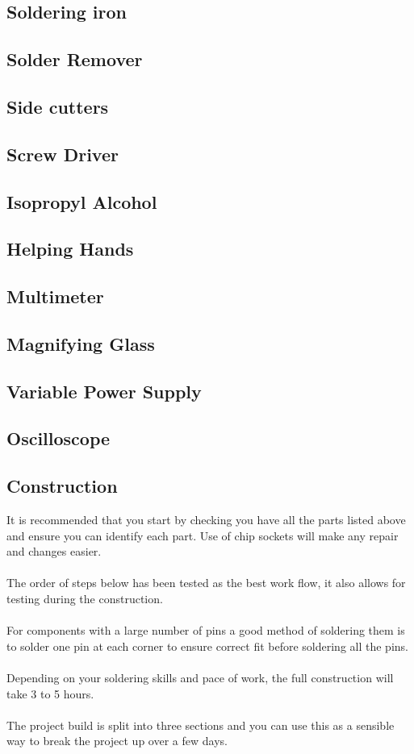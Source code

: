 \documentclass{ol-softwaremanual}
\begin{document}
\begin{ffcode}
\subsection{Soldering iron}
\subsection{Solder Remover}
\subsection{Side cutters}
\subsection{Screw Driver}
\subsection{Isopropyl Alcohol}
\subsection{Helping Hands}
\subsection{Multimeter}
\subsection{Magnifying Glass}
\subsection{Variable Power Supply}
\subsection{Oscilloscope}

\pagebreak

\subsection{Construction}
It is recommended that you start by checking you have all the parts listed above and ensure you can identify each part. Use of chip sockets will make any repair and changes easier.\\
\\
The order of steps below has been tested as the best work flow, it also allows for testing during the construction.\\
\\
For components with a large number of pins a good method of soldering them is to solder one pin at each corner to ensure correct fit before soldering all the pins.\\
\\
Depending on your soldering skills and pace of work, the full construction will take 3 to 5 hours.\\
\\
The project build is split into three sections and you can use this as a sensible way to break the project up over a few days.
\\


\end{ffcode}
\end{document}
